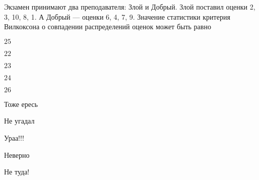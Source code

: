 
\begin{question}
Экзамен принимают два преподавателя: Злой и Добрый. Злой поставил оценки
2, 3, 10, 8, 1. А Добрый --- оценки 6, 4, 7, 9. Значение статистики
критерия Вилкоксона о совпадении распределений оценок может быть равно
\begin{answerlist}
  \item \(25\)
  \item \(22\)
  \item \(23\)
  \item \(24\)
  \item \(26\)
\end{answerlist}
\end{question}

\begin{solution}
\begin{answerlist}
  \item Тоже ересь
  \item Не угадал
  \item Ураа!!!
  \item Неверно
  \item Не туда!
\end{answerlist}
\end{solution}

